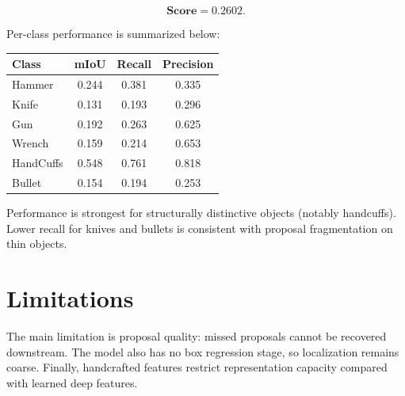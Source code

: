 \documentclass[11pt]{article}
\begin{document}
\[
\textbf{Score} = 0.2602.
\]

Per-class performance is summarized below:

\begin{center}
\begin{tabular}{lccc}
\toprule
Class & mIoU & Recall & Precision \\
\midrule
Hammer     & 0.244 & 0.381 & 0.335 \\
Knife      & 0.131 & 0.193 & 0.296 \\
Gun        & 0.192 & 0.263 & 0.625 \\
Wrench     & 0.159 & 0.214 & 0.653 \\
HandCuffs  & 0.548 & 0.761 & 0.818 \\
Bullet     & 0.154 & 0.194 & 0.253 \\
\bottomrule
\end{tabular}
\end{center}

Performance is strongest for structurally distinctive objects (notably handcuffs). Lower recall for knives and bullets is consistent with proposal fragmentation on thin objects.

\section*{Limitations}

The main limitation is proposal quality: missed proposals cannot be recovered downstream. The model also has no box regression stage, so localization remains coarse. Finally, handcrafted features restrict representation capacity compared with learned deep features.
\end{document}
